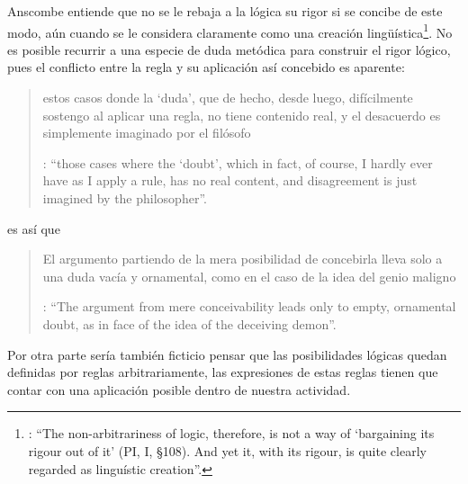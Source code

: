 Anscombe entiende que no se le rebaja a la lógica su rigor si se concibe de este modo, aún cuando se le considera claramente como una creación lingüística\footnote{\cite[Cf.][124]{anscombe1981parmenides:qli}: \enquote{The non-arbitrariness of logic, therefore, is not a way of `bargaining its rigour out of it' (PI, I, \S108). And yet it, with its rigour, is quite clearly regarded as linguístic creation}.}. No es posible recurrir a una especie de duda metódica para construir el rigor lógico, pues el conflicto entre la regla y su aplicación así concebido es aparente: \blockquote[{\Cite[Cf.][124]{anscombe1981parmenides:qli}}: \enquote{those  cases where the `doubt', which in fact, of course, I hardly ever have as I apply a rule, has no real content, and disagreement is just imagined by the philosopher}.]{estos  casos donde la `duda', que de hecho, desde luego, difícilmente sostengo al aplicar una regla, no tiene contenido real, y el desacuerdo es simplemente imaginado por el filósofo}; es así que \blockquote[{\Cite[Cf.][124]{anscombe1981parmenides:qli}}: \enquote{The argument from mere conceivability leads only to empty, ornamental doubt, as in face of the idea of the deceiving demon}.]{El argumento partiendo de la mera posibilidad de concebirla lleva solo a una duda vacía y ornamental, como en el caso de la idea del genio maligno}. Por otra parte sería también ficticio pensar que las posibilidades lógicas quedan definidas por reglas arbitrariamente, las expresiones de estas reglas tienen que contar con una aplicación posible dentro de nuestra actividad. %